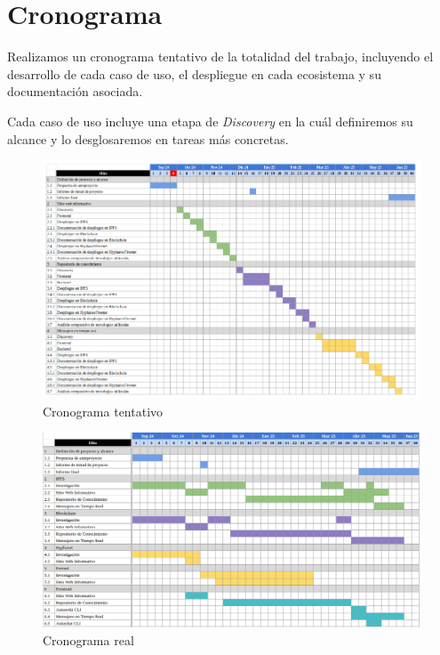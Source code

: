 \section{Cronograma}

Realizamos un cronograma tentativo de la totalidad del trabajo, incluyendo el desarrollo de cada caso de uso, el despliegue en cada ecosistema y su documentación asociada.

Cada caso de uso incluye una etapa de \textit{Discovery} en la cuál definiremos su alcance y lo desglosaremos en tareas más concretas.

\begin{figure}[H]
    \includegraphics[width=1\linewidth]{img/cronograma.png}
    \caption{Cronograma tentativo}
    \label{fig:enter-label}
\end{figure}

\begin{figure}[H]
    \centering
    \includegraphics[width=1\linewidth]{img/cronograma-real.png}
    \caption{Cronograma real}
    \label{fig:enter-label}
\end{figure}

